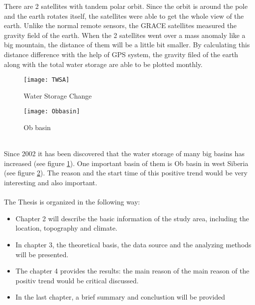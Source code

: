There are 2 satellites with tandem polar orbit. Since the orbit is around the pole and the earth rotates itself, the satellites were able to get the whole view of the earth. Unlike the normal remote sensors, the GRACE satellites measured the gravity field of the earth. When the 2 satellites went over a mass anomaly like a big mountain, the distance of them will be a little bit smaller. By calculating this distance difference with the help of GPS system, the gravity filed of the earth along with the total water storage are able to be plotted monthly. 
\begin{figure}[htbp]
	\centering
	\texttt{[image: TWSA]} %
	\caption{Water Storage Change} 
	\label{fig:TWSA}
\end{figure}
\begin{figure}[ht]
	\centering
	\texttt{[image: Obbasin]} %
	\caption{Ob basin} 
	\label{fig:Obbasin}
\end{figure}\\
Since 2002 it has been discovered that the water storage of many big basins has increased (see figure \ref{fig:TWSA}). One important basin of them is Ob basin in west Siberia (see figure \ref{fig:Obbasin}). The reason and the start time of this positive trend would be very interesting and also important. \\\\
The Thesis is organized in the following way:
\begin{itemize}
	\item Chapter 2 will describe the basic information of the study area, including the location, topography and climate.
	\item In chapter 3, the theoretical basis, the data source and the analyzing methods will be presented.
	\item The chapter 4 provides the results: the main reason of the main reason of the positiv trend would be critical discussed.
	\item In the last chapter, a brief summary and conclustion will be provided
\end{itemize}